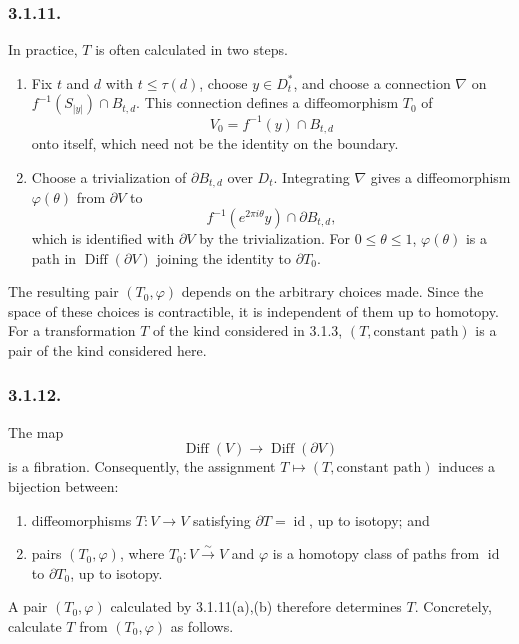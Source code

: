 \subsubsection*{3.1.11.}
In practice, $T$ is often calculated in two steps.

\begin{enumerate}[label=(\alph*)]
\item Fix $t$ and $d$ with $t\leq\tau(d)$, choose
  $y\in D_t^*$, and choose a connection $\nabla$ on
  $f^{-1}(S_{|y|})\cap B_{t,d}$.  This connection defines a
  diffeomorphism $T_0$ of
  \[
  V_0=f^{-1}(y)\cap B_{t,d}
  \]
  onto itself, which need not be the identity on the boundary.
\item Choose a trivialization of $\partial B_{t,d}$ over $D_t$.
  Integrating $\nabla$ gives a diffeomorphism $\varphi(\theta)$ from
  $\partial V$ to
  \[
  f^{-1}(e^{2\pi i\theta}y)\cap\partial B_{t,d},
  \]
  which is identified with $\partial V$ by the trivialization.  For
  $0\leq\theta\leq1$, $\varphi(\theta)$ is a path in
  $\operatorname{Diff}(\partial V)$ joining the identity to
  $\partial T_0$.
\end{enumerate}

The resulting pair $(T_0,\varphi)$ depends on the arbitrary choices
made.  Since the space of these choices is contractible, it is
independent of them up to homotopy.  For a transformation $T$ of the
kind considered in 3.1.3, $(T,\text{constant path})$ is a pair of the
kind considered here.

\subsubsection*{3.1.12.}
The map
\[
\operatorname{Diff}(V)\longrightarrow\operatorname{Diff}(\partial V)
\]
is a fibration.  Consequently, the assignment
$T\mapsto(T,\text{constant path})$ induces a bijection between:

\begin{enumerate}[label=\alph*)]
\item diffeomorphisms $T:V\to V$ satisfying
  $\partial T=\operatorname{id}$, up to isotopy; and
\item pairs $(T_0,\varphi)$, where $T_0:V\xrightarrow{\sim}V$ and
  $\varphi$ is a homotopy class of paths from
  $\operatorname{id}$ to $\partial T_0$, up to isotopy.
\end{enumerate}

A pair $(T_0,\varphi)$ calculated by 3.1.11(a),(b) therefore
determines $T$.  Concretely, calculate $T$ from $(T_0,\varphi)$ as
follows.

